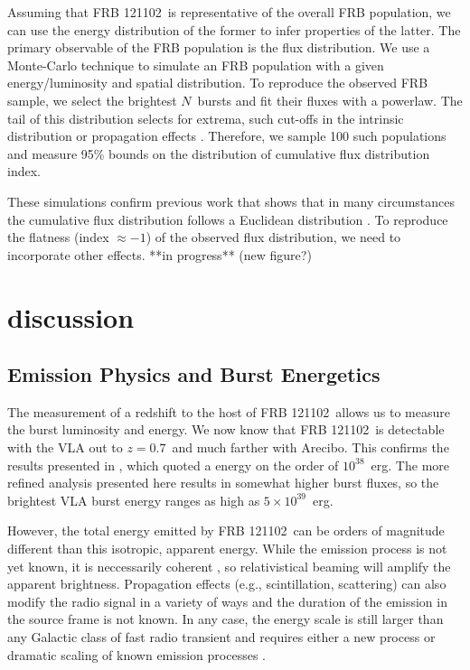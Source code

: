 \documentclass[twocolumn]{aastex61}
\newcommand{\frb}{FRB 121102}
\begin{document}
Assuming that \frb\ is representative of the overall FRB population, we can use the energy distribution of the former to infer properties of the latter. The primary observable of the FRB population is the flux distribution. We use a Monte-Carlo technique to simulate an FRB population with a given energy/luminosity and spatial distribution. To reproduce the observed FRB sample, we select the brightest $N$\ bursts and fit their fluxes with a powerlaw. The tail of this distribution selects for extrema, such cut-offs in the intrinsic distribution or propagation effects \citep{2015MNRAS.451.3278M, CORDES}. Therefore, we sample 100 such populations and measure 95\% bounds on the distribution of cumulative flux distribution index.

These simulations confirm previous work that shows that in many circumstances the cumulative flux distribution follows a Euclidean distribution \citep[index $=-1.5$;][]{2016MNRAS.462..941L}. To reproduce the flatness (index $\approx-1$) of the observed flux distribution, we need to incorporate other effects. 
**in progress** (new figure?)

\section{discussion}

\subsection{Emission Physics and Burst Energetics}
The measurement of a redshift to the host of \frb\ allows us to measure the burst luminosity and energy. We now know that \frb\ is detectable with the VLA out to $z=0.7$\ and much farther with Arecibo. This confirms the results presented in \citet{LOC}, which quoted a energy on the order of $10^{38}$\ erg. The more refined analysis presented here results in somewhat higher burst fluxes, so the brightest VLA burst energy ranges as high as $5\times10^{39}$\ erg.

However, the total energy emitted by \frb\ can be orders of magnitude different than this isotropic, apparent energy. While the emission process is not yet known, it is neccessarily coherent \citep{2016Natur.531..202S, WEIRD}, so relativistical beaming will amplify the apparent brightness. Propagation effects (e.g., scintillation, scattering) can also modify the radio signal in a variety of ways \citep{CORDES} and the duration of the emission in the source frame is not known. In any case, the energy scale is still larger than any Galactic class of fast radio transient and requires either a new process or dramatic scaling of known emission processes \citep{2016MNRAS.462..941L, 2016MNRAS.457..232C}.
\end{document}
